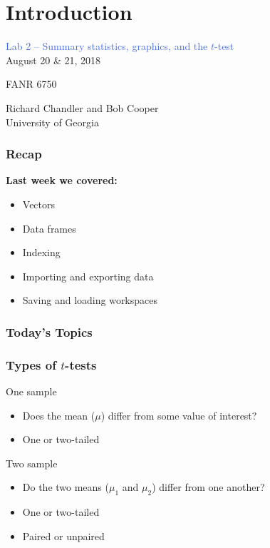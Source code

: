 \documentclass[color=usenames,dvipsnames]{beamer}\usepackage[]{graphicx}\usepackage[]{color}
\begin{document}



\section{Introduction}



\begin{frame}
  \LARGE
  \centering \par
  \textcolor{RoyalBlue}{\huge %
    Lab 2 -- Summary statistics,
    graphics, and the $t$-test} \\
  \vspace{1cm}
  August 20 \& 21, 2018 \par
  FANR 6750 \par
  \vfill
  \large
  Richard Chandler and Bob Cooper \\
  University of Georgia \\
\end{frame}




\begin{frame}[plain]
  \frametitle{Recap}
  \Large
  {\bf Last week we covered:}
  \begin{itemize}
    \item Vectors
    \item Data frames
    \item Indexing
    \item Importing and exporting data
    \item Saving and loading workspaces
  \end{itemize}
\end{frame}






\begin{frame}[plain]
  \frametitle{Today's Topics}
  \Large
\end{frame}



\begin{frame}
  \frametitle{Types of $t$-tests}
  One sample
  \begin{itemize}
    \item Does the mean ($\mu$) differ from some value of interest?
    \item One or two-tailed
  \end{itemize}
  \pause
  \vfill
  Two sample
  \begin{itemize}
    \item Do the two means ($\mu_1$ and $\mu_2$) differ from one another?
    \item One or two-tailed
    \item Paired or unpaired
  \end{itemize}
\end{frame}
\end{document}

